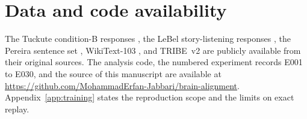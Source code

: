 \documentclass{article}
\begin{document}









\appendix







\section*{Data and code availability}
The Tuckute condition-B responses \autocite{tuckute2024}, the LeBel story-listening responses \autocite{lebel2023}, the Pereira sentence set \autocite{pereira2018}, WikiText-103 \autocite{merity2017}, and TRIBE~v2 \autocite{dascoli2026} are publicly available from their original sources.
The analysis code, the numbered experiment records E001 to E030, and the source of this manuscript are available at \url{https://github.com/MohammadErfan-Jabbari/brain-alignment}.
Appendix~\ref{app:training} states the reproduction scope and the limits on exact replay.

\printbibliography
\end{document}
